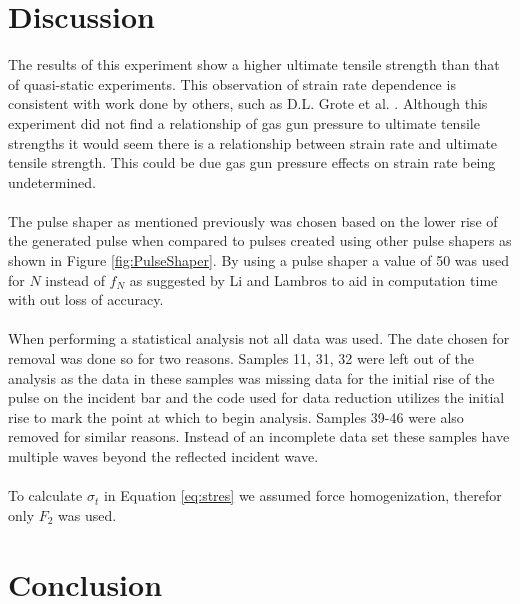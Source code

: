 \documentclass[12pt]{article}
\begin{document}
\section{Discussion} %
The results of this experiment show a higher ultimate tensile strength than that of quasi-static experiments. This observation of strain rate dependence is consistent with work done by others, such as D.L. Grote et al. \cite{Grote}. Although this experiment did not find a relationship of gas gun pressure to ultimate tensile strengths it would seem there is a relationship  between strain rate and ultimate tensile strength. This could be due gas gun pressure effects on strain rate being undetermined. 
\\
\\
The pulse shaper as mentioned previously was chosen based on the lower rise of the generated pulse when compared to pulses created using other pulse shapers as shown in Figure \ref{fig:PulseShaper}. By using a pulse shaper a value of 50 was used for $N$ instead of $f_N$ as suggested by Li and Lambros \cite{Li} to aid in computation time with out loss of accuracy.
\\
\\
When performing a statistical analysis not all data was used.  The date chosen for removal was done so for two reasons.  Samples 11, 31, 32 were left out of the analysis as the data in these samples was missing data for the initial rise of the pulse on the incident bar and the code used for data reduction utilizes the initial rise to mark the point at which to begin analysis.  Samples 39-46 were also removed for similar reasons.  Instead of an incomplete data set these samples have multiple waves beyond the  reflected incident wave.
\\
\\
To calculate $\sigma_t$ in Equation \ref{eq:stres} we assumed force homogenization, therefor only $F_2$ was used.


\section{Conclusion} %

\end{document}
